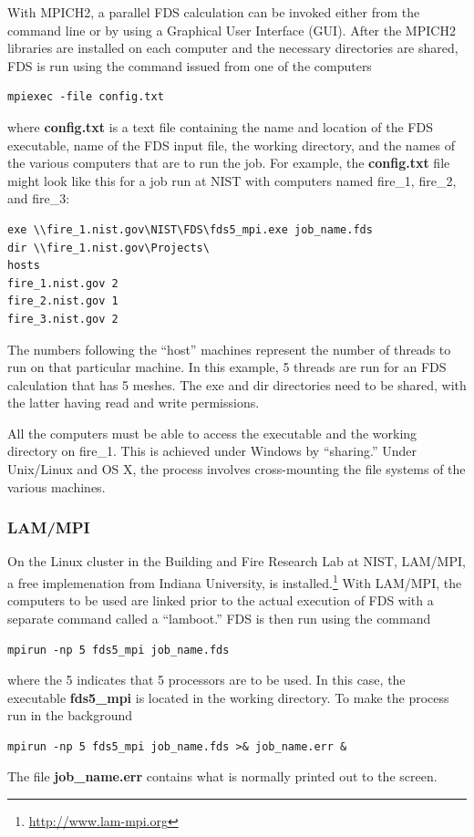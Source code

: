 \documentclass[11pt]{book}
\begin{document}
With MPICH2, a parallel FDS calculation can be invoked either
from the command line or by using a Graphical User Interface
(GUI). After the MPICH2 libraries are installed on each computer and
the necessary directories are shared, FDS is run using the command
issued from one of the computers
\begin{verbatim}
mpiexec -file config.txt
\end{verbatim}
where {\bf config.txt} is a text file containing the name and location
of the FDS executable, name of the FDS input file, the working directory,
and the names of the various computers that are to run the job. For
example, the {\bf config.txt} file might look like this for a job run at NIST with computers named
fire\_1, fire\_2, and fire\_3:
\begin{verbatim}
exe \\fire_1.nist.gov\NIST\FDS\fds5_mpi.exe job_name.fds
dir \\fire_1.nist.gov\Projects\
hosts
fire_1.nist.gov 2
fire_2.nist.gov 1
fire_3.nist.gov 2
\end{verbatim}
The numbers following the ``host'' machines represent the number of threads to run on that particular machine. In this
example, 5 threads are run for an FDS calculation that has 5 meshes. The {\ct exe} and {\ct dir} directories need to be shared, with the
latter having read and write permissions.

\begin{warning}
\noindent
All the computers must be able to access the executable and the working directory on {\ct fire\_1}.
This is achieved under Windows by ``sharing.'' Under Unix/Linux and OS X, the process involves cross-mounting the file
systems of the various machines.
\end{warning}


\subsubsection{LAM/MPI}

On the Linux cluster in the Building and Fire Research Lab at NIST, LAM/MPI, a free implemenation from Indiana University,
is installed.\footnote{\href{http://www.lam-mpi.org}{{\ct http://www.lam-mpi.org}}}
With LAM/MPI, the computers to be used are linked prior to the actual execution of FDS with a separate
command called a ``lamboot.''
FDS is then run using the command
\begin{verbatim}
mpirun -np 5 fds5_mpi job_name.fds
\end{verbatim}
where the 5 indicates that 5 processors are to be used. In this case, the executable {\bf fds5\_mpi} is located in the
working directory. To make the process run in the background
\begin{verbatim}
mpirun -np 5 fds5_mpi job_name.fds >& job_name.err &
\end{verbatim}
The file {\bf job\_name.err} contains what is normally printed out to the screen.
\end{document}
